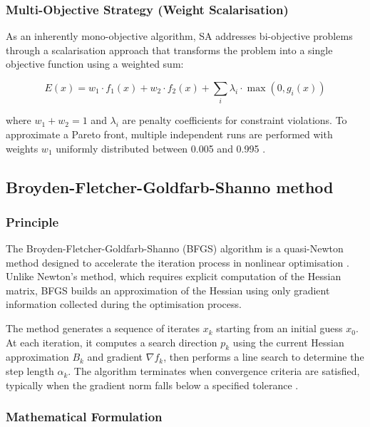 \subsubsection{Multi-Objective Strategy (Weight Scalarisation)}

As an inherently mono-objective algorithm, SA addresses bi-objective problems through a scalarisation approach that transforms the problem into a single objective function using a weighted sum:

\begin{equation}
E(x) = w_1 \cdot f_1(x) + w_2 \cdot f_2(x) + \sum_{i} \lambda_i \cdot \max(0, g_i(x))
\end{equation}

where $w_1 + w_2 = 1$ and $\lambda_i$ are penalty coefficients for constraint violations. To approximate a Pareto front, multiple independent runs are performed with weights $w_1$ uniformly distributed between 0.005 and 0.995 \cite{task3_chenonceau}.

\subsection{Broyden-Fletcher-Goldfarb-Shanno method}

\subsubsection{Principle}

The Broyden-Fletcher-Goldfarb-Shanno (BFGS) algorithm is a quasi-Newton method designed to accelerate the iteration process in nonlinear optimisation \cite{task4_chenonceau}. Unlike Newton's method, which requires explicit computation of the Hessian matrix, BFGS builds an approximation of the Hessian using only gradient information collected during the optimisation process.

The method generates a sequence of iterates $x_k$ starting from an initial guess $x_0$. At each iteration, it computes a search direction $p_k$ using the current Hessian approximation $B_k$ and gradient $\nabla f_k$, then performs a line search to determine the step length $\alpha_k$. The algorithm terminates when convergence criteria are satisfied, typically when the gradient norm falls below a specified tolerance \cite{task4_chenonceau}.

\subsubsection{Mathematical Formulation}

